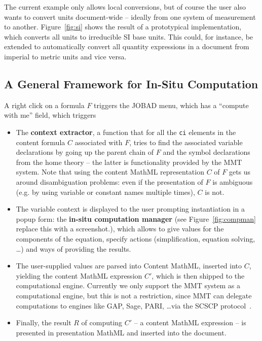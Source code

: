 The current example only allows local conversions, but of course the user also wants
to convert units document-wide -- ideally from one system of measurement to another. 
Figure~\ref{fig:si} shows the result of a prototypical implementation, which 
converts all units to irreducible SI base units. 
This could, for instance, be extended to automatically convert all quantity
expressions in a document from imperial to metric units and vice versa. 

\subsection{A General Framework for In-Situ Computation}\label{sec:impl:general}

  A right click on a formula $F$ triggers the JOBAD menu, which has a ``compute with me''
  field, which triggers
  \begin{itemize}
  \item The \textbf{context extractor}, a function that for all the \lstinline|ci|
    elements in the content formula $C$ associated with $F$, tries to find the associated
    variable declarations by going up the parent chain of $F$ and the symbol declarations
    from the home theory -- the latter is functionality provided by the MMT system. Note
    that using the content MathML representation $C$ of $F$ gets us around disambiguation
    problems: even if the presentation of $F$ is ambiguous (e.g. by using variable or
    constant names multiple times), $C$ is not.
  \item The variable context is displayed to the user prompting instantiation in a popup
    form: the \textbf{in-situ computation manager} (see Figure~\ref{fig:compman}\ednote
    {replace this with a screenshot.}), which allows to give values for the components of
    the equation, specify actions (simplification, equation solving, \ldots) and ways of
    providing the results.
  \item The user-supplied values are parsed into Content MathML, inserted into $C$,
    yielding the content MathML expression $C'$, which is then shipped to the
    computational engine. Currently we only support the MMT system as a computational
    engine, but this is not a restriction, since MMT can delegate computations to engines
    like GAP, Sage, PARI, \ldots via the SCSCP protocol~\cite{ODK-D3.3}. 
  \item Finally, the result $R$ of computing $C'$ -- a content MathML expression -- is
    presented in presentation MathML and inserted into the document. 
  \end{itemize}


